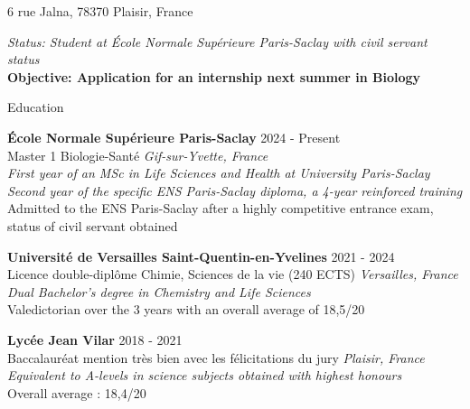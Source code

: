\documentclass[
	10pt,
]{style} %
\begin{document}
\vspace{-0.25em}

\begin{center}
	6 rue Jalna, 78370 Plaisir, France \\
\end{center}

\begin{center}
	\textit{Status: Student at École Normale Supérieure Paris-Saclay with civil servant status} \\
	\textbf{Objective: Application for an internship next summer in Biology}
\end{center}


\begin{rSection}{Education}

	\textbf{École Normale Supérieure Paris-Saclay} \hfill 2024 - Present \\
	Master 1 Biologie-Santé \hfill \textit{Gif-sur-Yvette, France} \\
	\textit{First year of an MSc in Life Sciences and Health at University Paris-Saclay} \\
	\textit{Second year of the specific ENS Paris-Saclay diploma, a 4-year reinforced training} \\
	Admitted to the ENS Paris-Saclay after a highly competitive entrance exam, status of civil servant obtained

	\vspace{0.5mm}

	\textbf{Université de Versailles Saint-Quentin-en-Yvelines} \hfill 2021 - 2024 \\
	Licence double-diplôme Chimie, Sciences de la vie (240 ECTS) \hfill \textit{Versailles, France} \\
	\textit{Dual Bachelor's degree in Chemistry and Life Sciences} \\
	Valedictorian over the 3 years with an overall average of 18,5/20

	\vspace{0.5mm}

	\textbf{Lycée Jean Vilar} \hfill 2018 - 2021 \\
	Baccalauréat mention très bien avec les félicitations du jury \hfill \textit{Plaisir, France} \\
	\textit{Equivalent to A-levels in science subjects obtained with highest honours} \\
	Overall average : 18,4/20
\end{rSection}
\end{document}
